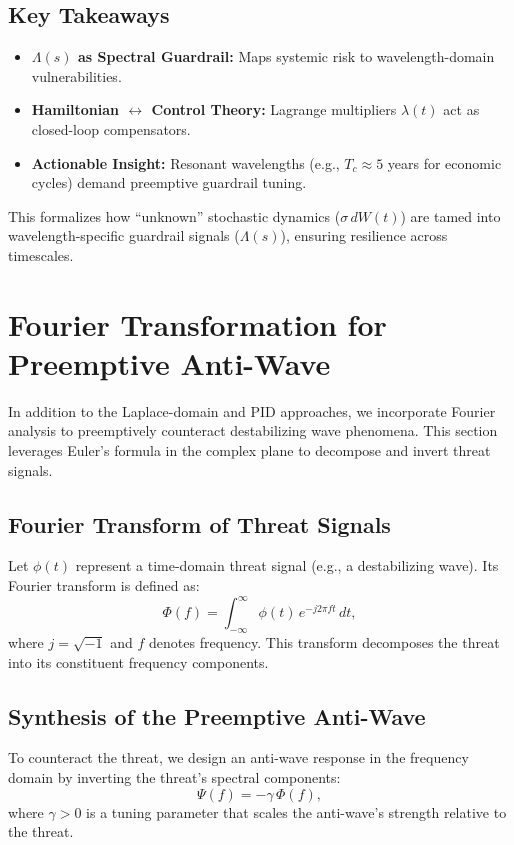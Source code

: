 \documentclass{article}
\theoremstyle{definition}
\begin{document}
\subsection{Key Takeaways}
\begin{itemize}
    \item \textbf{$\Lambda(s)$ as Spectral Guardrail:} Maps systemic risk to wavelength-domain vulnerabilities.
    \item \textbf{Hamiltonian $\leftrightarrow$ Control Theory:} Lagrange multipliers $\lambda(t)$ act as closed-loop compensators.
    \item \textbf{Actionable Insight:} Resonant wavelengths (e.g., $T_c \approx 5$ years for economic cycles) demand preemptive guardrail tuning.
\end{itemize}

This formalizes how “unknown” stochastic dynamics ($\sigma\, dW(t)$) are tamed into wavelength-specific guardrail signals ($\Lambda(s)$), ensuring resilience across timescales.

\section{Fourier Transformation for Preemptive Anti-Wave}

In addition to the Laplace-domain and PID approaches, we incorporate Fourier analysis to preemptively counteract destabilizing wave phenomena. This section leverages Euler's formula in the complex plane to decompose and invert threat signals.

\subsection{Fourier Transform of Threat Signals}
Let $\phi(t)$ represent a time-domain threat signal (e.g., a destabilizing wave). Its Fourier transform is defined as:
\[
\Phi(f) = \int_{-\infty}^{\infty} \phi(t) \, e^{-j 2\pi f t} \, dt,
\]
where $j = \sqrt{-1}$ and $f$ denotes frequency. This transform decomposes the threat into its constituent frequency components.

\subsection{Synthesis of the Preemptive Anti-Wave}
To counteract the threat, we design an anti-wave response in the frequency domain by inverting the threat's spectral components:
\[
\Psi(f) = -\gamma\, \Phi(f),
\]
where $\gamma > 0$ is a tuning parameter that scales the anti-wave's strength relative to the threat.
\end{document}
